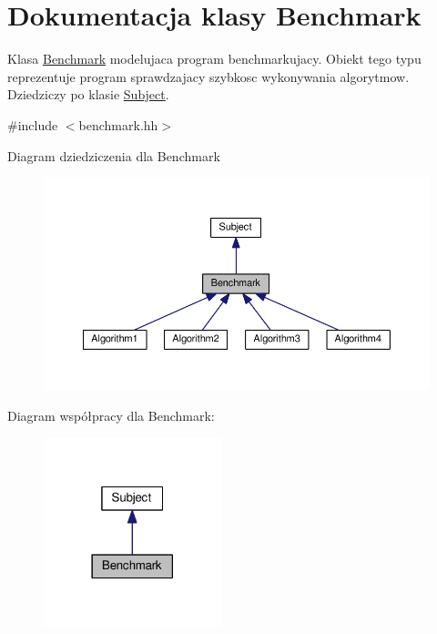 \hypertarget{class_benchmark}{\section{Dokumentacja klasy Benchmark}
\label{class_benchmark}
}


Klasa \hyperlink{class_benchmark}{Benchmark} modelujaca program benchmarkujacy. Obiekt tego typu reprezentuje program sprawdzajacy szybkosc wykonywania algorytmow. Dziedziczy po klasie \hyperlink{class_subject}{Subject}.  




{\ttfamily \#include $<$benchmark.\-hh$>$}



Diagram dziedziczenia dla Benchmark
\nopagebreak
\begin{figure}[H]
\begin{center}
\leavevmode
\includegraphics[width=350pt]{class_benchmark__inherit__graph}
\end{center}
\end{figure}


Diagram współpracy dla Benchmark\-:
\nopagebreak
\begin{figure}[H]
\begin{center}
\leavevmode
\includegraphics[width=146pt]{class_benchmark__coll__graph}
\end{center}
\end{figure}

